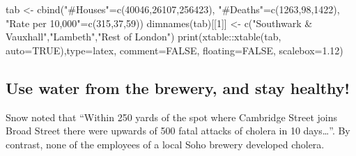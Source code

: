 \documentclass[
  10pt,
  b5paper]{book}
\newenvironment{Shaded}{\begin{snugshade}}{\end{snugshade}}
\newcommand{\AttributeTok}[1]{\textcolor[rgb]{0.77,0.63,0.00}{#1}}
\newcommand{\ConstantTok}[1]{\textcolor[rgb]{0.00,0.00,0.00}{#1}}
\newcommand{\DecValTok}[1]{\textcolor[rgb]{0.00,0.00,0.81}{#1}}
\newcommand{\FloatTok}[1]{\textcolor[rgb]{0.00,0.00,0.81}{#1}}
\newcommand{\FunctionTok}[1]{\textcolor[rgb]{0.00,0.00,0.00}{#1}}
\newcommand{\NormalTok}[1]{#1}
\newcommand{\OtherTok}[1]{\textcolor[rgb]{0.56,0.35,0.01}{#1}}
\newcommand{\SpecialCharTok}[1]{\textcolor[rgb]{0.00,0.00,0.00}{#1}}
\newcommand{\StringTok}[1]{\textcolor[rgb]{0.31,0.60,0.02}{#1}}
\begin{document}
\begin{Shaded}
\begin{Highlighting}[]
\NormalTok{tab }\OtherTok{\textless{}{-}} \FunctionTok{cbind}\NormalTok{(}\StringTok{"\#Houses"}\OtherTok{=}\FunctionTok{c}\NormalTok{(}\DecValTok{40046}\NormalTok{,}\DecValTok{26107}\NormalTok{,}\DecValTok{256423}\NormalTok{),}
             \StringTok{"\#Deaths"}\OtherTok{=}\FunctionTok{c}\NormalTok{(}\DecValTok{1263}\NormalTok{,}\DecValTok{98}\NormalTok{,}\DecValTok{1422}\NormalTok{),}
             \StringTok{"Rate per 10,000"}\OtherTok{=}\FunctionTok{c}\NormalTok{(}\DecValTok{315}\NormalTok{,}\DecValTok{37}\NormalTok{,}\DecValTok{59}\NormalTok{))}
\FunctionTok{dimnames}\NormalTok{(tab)[[}\DecValTok{1}\NormalTok{]] }\OtherTok{\textless{}{-}} \FunctionTok{c}\NormalTok{(}\StringTok{"Southwark \& Vauxhall"}\NormalTok{,}\StringTok{"Lambeth"}\NormalTok{,}\StringTok{"Rest of London"}\NormalTok{)}
\FunctionTok{print}\NormalTok{(xtable}\SpecialCharTok{::}\FunctionTok{xtable}\NormalTok{(tab, }\AttributeTok{auto=}\ConstantTok{TRUE}\NormalTok{),}\AttributeTok{type=}\StringTok{\textquotesingle{}latex\textquotesingle{}}\NormalTok{, }\AttributeTok{comment=}\ConstantTok{FALSE}\NormalTok{, }\AttributeTok{floating=}\ConstantTok{FALSE}\NormalTok{, }\AttributeTok{scalebox=}\FloatTok{1.12}\NormalTok{)}
\end{Highlighting}
\end{Shaded}


\hypertarget{use-water-from-the-brewery-and-stay-healthy}{%
\subsection*{Use water from the brewery, and stay healthy!}\label{use-water-from-the-brewery-and-stay-healthy}}

Snow noted that ``Within 250 yards of the spot where Cambridge Street joins Broad
Street there were upwards of 500 fatal attacks of cholera in 10 days\ldots{}''.
By contrast, none of the employees of a local Soho brewery developed cholera.
\end{document}
